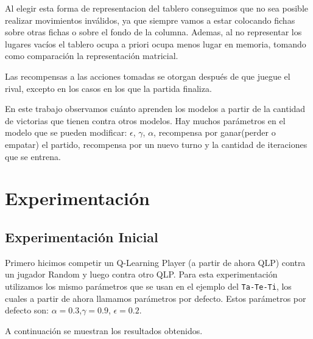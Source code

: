 \documentclass[10pt, a4paper]{article}
\begin{document}
Al elegir esta forma de representacion del tablero conseguimos que no sea posible realizar movimientos inválidos, ya que siempre vamos a estar colocando fichas sobre otras fichas o sobre el fondo de la columna. Ademas, al no representar los lugares vacíos el tablero ocupa a priori ocupa menos lugar en memoria, tomando como comparación la representación matricial.


Las recompensas a las acciones tomadas se otorgan después de que juegue el rival, excepto en los casos en los que la partida finaliza.


En este trabajo observamos cuánto aprenden los modelos a partir de la cantidad de victorias que tienen contra otros modelos.
Hay muchos parámetros en el modelo que se pueden modificar:
$\epsilon$,  $\gamma$, $\alpha$, recompensa por ganar(perder o empatar) el partido, recompensa por un nuevo turno y la cantidad de iteraciones que se entrena.


\section{Experimentación}


\subsection{Experimentación Inicial}


Primero hicimos competir un Q-Learning Player (a partir de ahora QLP) contra un jugador Random y luego contra otro QLP. Para esta experimentación utilizamos los mismo parámetros que se usan en el ejemplo del \texttt{Ta-Te-Ti}, los cuales a partir de ahora llamamos parámetros por defecto. Estos parámetros por defecto son: $\alpha=0.3$,$\gamma=0.9$, $\epsilon=0.2$.

A continuación se muestran los resultados obtenidos.
\end{document}
